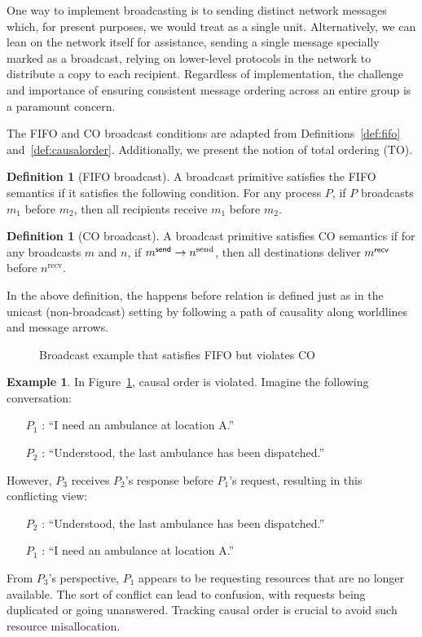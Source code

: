 \documentclass[]             %
{NASA}                       %
\theoremstyle{definition}
\newtheorem{example}[theorem]{Example}
\newtheorem{definition}[theorem]{Definition}
\providecommand{\tightlist}{%
  \setlength{\itemsep}{0pt}\setlength{\parskip}{0pt}}
\begin{document}
One way to implement broadcasting is to sending distinct network
messages which, for present purposes, we would treat as a single
unit. Alternatively, we can lean on the network itself for assistance,
sending a single message specially marked as a broadcast, relying on
lower-level protocols in the network to distribute a copy to each
recipient. Regardless of implementation, the challenge and importance
of ensuring consistent message ordering across an entire group is a
paramount concern.

The FIFO and CO broadcast conditions are adapted from
Definitions~\ref{def:fifo} and~\ref{def:causalorder}. Additionally, we
present the notion of total ordering (TO).

\begin{definition}[FIFO broadcast]
  \label{def:fifo-bcast}
  A broadcast primitive satisfies the FIFO semantics if it satisfies
  the following condition. For any process $P$, if $P$ broadcasts
  $m_1$ before $m_2$, then all recipients receive $m_1$ before $m_2$.
\end{definition}

\begin{definition}[CO broadcast]
  \label{def:causalorder-bcast}
  A broadcast primitive satisfies CO semantics if for any broadcasts
  $m$ and $n$, if $m_{}^{\mathsf{send}} \to n^{\textrm{send}}$, then all
  destinations deliver $m_{}^{\mathsf{recv}}$ before $n^{\textrm{recv}}$.
\end{definition}
In the above definition, the happens before relation is defined just
as in the unicast (non-broadcast) setting by following a path of
causality along worldlines and message arrows.

\begin{figure}[ht]
  \centering 
  \caption{Broadcast example that satisfies FIFO but violates CO}
  \label{fig:broadcast-fifo-1}
\end{figure}

\begin{example}
  In Figure~\ref{fig:broadcast-fifo-1}, causal order is violated. Imagine the following conversation:
  \begin{itemize}
    \tightlist
  \item [$P_1$]: ``I need an ambulance at location A.''
  \item [$P_2$]: ``Understood, the last ambulance has been dispatched.''
  \end{itemize}
  However, $P_3$ receives $P_2$'s response before $P_1$'s request, resulting in this conflicting view:
  \begin{itemize}
    \tightlist
  \item [$P_2$]: ``Understood, the last ambulance has been dispatched.''
  \item [$P_1$]: ``I need an ambulance at location A.''
  \end{itemize}
  From $P_3$'s perspective, $P_1$ appears to be requesting resources
  that are no longer available. The sort of conflict can lead to
  confusion, with requests being duplicated or going
  unanswered. Tracking causal order is crucial to avoid such resource
  misallocation.
\end{example}
\end{document}
